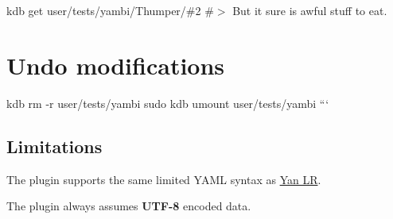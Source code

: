 kdb get user/tests/yambi/\+Thumper/\#2 \#$>$ But it sure is awful stuff to eat.

\section*{Undo modifications}

kdb rm -\/r user/tests/yambi sudo kdb umount user/tests/yambi ```

\subsection*{Limitations}

The plugin supports the same limited Y\+A\+ML syntax as \hyperlink{md_src_plugins_yanlr_README_src_plugins_yanlr_README_md}{Yan LR}.


\begin{DoxyItemize}
\item The plugin always assumes {\bfseries U\+T\+F-\/8} encoded data. 
\end{DoxyItemize}